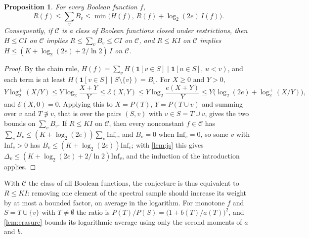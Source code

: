 \documentclass[11pt]{amsart}
\newtheorem{proposition}[theorem]{Proposition}
\theoremstyle{remark}
\newcommand{\Inf}{\mathrm{Inf}}
\begin{document}
\begin{proposition}\label{prop:local}
For every Boolean function $f$,
\[
R(f)\le\sum_vB_v\le\min\bigl(H(f),\,R(f)+\log_2(2e)\,I(f)\bigr).
\]
Consequently, if $\mathcal C$ is a class of Boolean functions closed under restrictions, then $H\le CI$ on $\mathcal C$
implies $R\le\sum_vB_v\le CI$ on $\mathcal C$, and $R\le KI$ on $\mathcal C$ implies
$H\le(K+\log_2(2e)+2/\ln2)\,I$ on $\mathcal C$.
\end{proposition}

\begin{proof}
By the chain rule, $H(f)=\sum_vH(\mathbf 1[v\in S]\mid\mathbf 1[u\in S],\,u<v)$, and each term is at least
$H(\mathbf 1[v\in S]\mid S\setminus\{v\})=B_v$. For $X\ge0$ and $Y>0$,
\[
Y\log_2^+(X/Y)\le Y\log_2\frac{X+Y}Y\le\mathcal E(X,Y)\le Y\log_2\frac{e(X+Y)}Y\le Y\bigl(\log_2(2e)+\log_2^+(X/Y)\bigr),
\]
and $\mathcal E(X,0)=0$. Applying this to $X=P(T)$, $Y=P(T\cup v)$ and summing over $v$ and $T\not\ni v$, that is over
the pairs $(S,v)$ with $v\in S=T\cup v$, gives the two bounds on $\sum_vB_v$. If $R\le KI$ on $\mathcal C$, then every
nonconstant $f\in\mathcal C$ has $\sum_vB_v\le(K+\log_2(2e))\sum_v\Inf_v$, and $B_v=0$ when $\Inf_v=0$, so some $v$
with $\Inf_v>0$ has $B_v\le(K+\log_2(2e))\Inf_v$; with \cref{lem:js} this gives
$\Delta_v\le(K+\log_2(2e)+2/\ln2)\Inf_v$, and the induction of the introduction applies.
\end{proof}

With $\mathcal C$ the class of all Boolean functions, the conjecture is thus equivalent to $R\le KI$: removing one
element of the spectral sample should increase its weight by at most a bounded factor, on average in the logarithm.
For monotone $f$ and $S=T\cup\{v\}$ with $T\neq\emptyset$ the ratio is $P(T)/P(S)=\bigl(1+b(T)/a(T)\bigr)^2$, and
\cref{lem:erasure} bounds its logarithmic average using only the second moments of $a$ and $b$.
\end{document}
